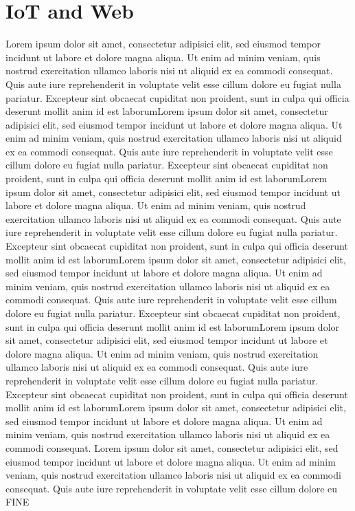 \section{IoT and Web}

Lorem ipsum dolor sit amet, consectetur adipisici elit, sed eiusmod tempor incidunt ut labore et dolore magna aliqua. Ut enim ad minim veniam, quis nostrud exercitation ullamco laboris nisi ut aliquid ex ea commodi consequat. Quis aute iure reprehenderit in voluptate velit esse cillum dolore eu fugiat nulla pariatur. Excepteur sint obcaecat cupiditat non proident, sunt in culpa qui officia deserunt mollit anim id est laborumLorem ipsum dolor sit amet, consectetur adipisici elit, sed eiusmod tempor incidunt ut labore et dolore magna aliqua. Ut enim ad minim veniam, quis nostrud exercitation ullamco laboris nisi ut aliquid ex ea commodi consequat. Quis aute iure reprehenderit in voluptate velit esse cillum dolore eu fugiat nulla pariatur. Excepteur sint obcaecat cupiditat non proident, sunt in culpa qui officia deserunt mollit anim id est laborumLorem ipsum dolor sit amet, consectetur adipisici elit, sed eiusmod tempor incidunt ut labore et dolore magna aliqua. Ut enim ad minim veniam, quis nostrud exercitation ullamco laboris nisi ut aliquid ex ea commodi consequat. Quis aute iure reprehenderit in voluptate velit esse cillum dolore eu fugiat nulla pariatur. Excepteur sint obcaecat cupiditat non proident, sunt in culpa qui officia deserunt mollit anim id est laborumLorem ipsum dolor sit amet, consectetur adipisici elit, sed eiusmod tempor incidunt ut labore et dolore magna aliqua. Ut enim ad minim veniam, quis nostrud exercitation ullamco laboris nisi ut aliquid ex ea commodi consequat. Quis aute iure reprehenderit in voluptate velit esse cillum dolore eu fugiat nulla pariatur. Excepteur sint obcaecat cupiditat non proident, sunt in culpa qui officia deserunt mollit anim id est laborumLorem ipsum dolor sit amet, consectetur adipisici elit, sed eiusmod tempor incidunt ut labore et dolore magna aliqua. Ut enim ad minim veniam, quis nostrud exercitation ullamco laboris nisi ut aliquid ex ea commodi consequat. Quis aute iure reprehenderit in voluptate velit esse cillum dolore eu fugiat nulla pariatur. Excepteur sint obcaecat cupiditat non proident, sunt in culpa qui officia deserunt mollit anim id est laborumLorem ipsum dolor sit amet, consectetur adipisici elit, sed eiusmod tempor incidunt ut labore et dolore magna aliqua. Ut enim ad minim veniam, quis nostrud exercitation ullamco laboris nisi ut aliquid ex ea commodi consequat.
Lorem ipsum dolor sit amet, consectetur adipisici elit, sed eiusmod tempor incidunt ut labore et dolore magna aliqua. Ut enim ad minim veniam, quis nostrud exercitation ullamco laboris nisi ut aliquid ex ea commodi consequat. Quis aute iure reprehenderit in voluptate velit esse cillum dolore eu FINE

